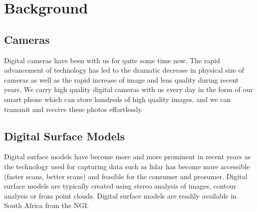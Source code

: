 

\section{Background}
\subsection{Cameras}
Digital cameras have been with us for quite some time now. 
The rapid advancement of technology has led to the dramatic decrease in physical size of cameras as well as the rapid increase of image and lens quality during recent years. 
We carry high quality digital cameras with us every day in the form of our smart phone which can store hundreds of high quality images, and we can transmit and receive these photos effortlessly.

\subsection{Digital Surface Models}
Digital surface models have become more and more prominent in recent years as the technology used for capturing data such as lidar has become more accessible (faster scans, better scans) and feasible for the consumer and prosumer. 
Digital surface models are typically created using stereo analysis of images, contour analysis or from point clouds. 
Digital surface models are readily available in South Africa from the NGI.